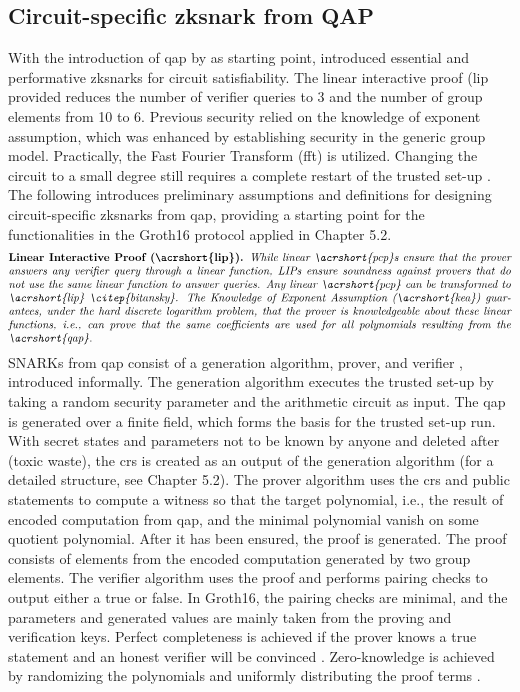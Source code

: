 \subsection{Circuit-specific \acrshort{zksnark} from QAP}
With the introduction of \acrshort{qap} by \citet{GennaroLinPCP} as starting point, \citet{Groth2016OnTS} introduced essential and performative \acrshort{zksnark}s for circuit satisfiability. The linear interactive proof (\acrshort{lip} provided reduces the number of verifier queries to 3 and the number of group elements from 10 to 6. Previous security relied on the knowledge of exponent assumption, which was enhanced by establishing security in the generic group model. Practically, the Fast Fourier Transform (\acrshort{fft}) is utilized. Changing the circuit to a small degree still requires a complete restart of the trusted set-up \citep{Thaler}. The following introduces preliminary assumptions and definitions for designing circuit-specific \acrshort{zksnark}s from \acrshort{qap}, providing a starting point for the functionalities in the Groth16 protocol applied in Chapter 5.2.
\begin{align*}
    \text{\parbox{450pt}{\textbf{Linear Interactive Proof (\acrshort{lip}).} \textit{While linear \acrshort{pcp}s ensure that the prover answers any verifier query through a linear function, LIPs ensure soundness against provers that do not use the same linear function to answer queries. Any linear \acrshort{pcp} can be transformed to \acrshort{lip} \citep{bitansky}. The Knowledge of Exponent Assumption (\acrshort{kea}) guarantees, under the hard discrete logarithm problem, that the prover is knowledgeable about these linear functions, i.e., can prove that the same coefficients are used for all polynomials resulting from the \acrshort{qap}.}}}
\end{align*}
SNARKs from \acrshort{qap} consist of a generation algorithm, prover, and verifier \citep{Groth2016OnTS, Guo, Benamara}, introduced informally.
The generation algorithm executes the trusted set-up by taking a random security parameter and the arithmetic circuit as input. The \acrshort{qap} is generated over a finite field, which forms the basis for the trusted set-up run. With secret states and parameters not to be known by anyone and deleted after (toxic waste), the \acrshort{crs} is created as an output of the generation algorithm (for a detailed structure, see Chapter 5.2). The prover algorithm uses the \acrshort{crs} and public statements to compute a witness so that the target polynomial, i.e., the result of encoded computation from \acrshort{qap}, and the minimal polynomial vanish on some quotient polynomial. After it has been ensured, the proof is generated. The proof consists of elements from the encoded computation generated by two group elements. The verifier algorithm uses the proof and performs pairing checks to output either a true or false. In Groth16, the pairing checks are minimal, and the parameters and generated values are mainly taken from the proving and verification keys. Perfect completeness is achieved if the prover knows a true statement and an honest verifier will be convinced \citep{Guo}. Zero-knowledge is achieved by randomizing the polynomials and uniformly distributing the proof terms \citep{Groth2016OnTS, Groth2010ShortPN}.

